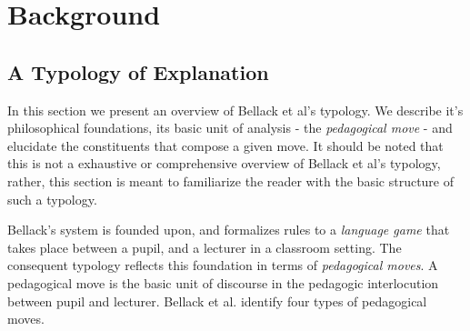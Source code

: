 \documentclass[conference]{IEEEtran}
\begin{document}
\section{Background}
\subsection{A Typology of Explanation}
In this section we present an overview of Bellack et al's typology. We describe
it's philosophical foundations, its basic unit of analysis - the
\emph{pedagogical move} - and elucidate the constituents that compose a given
move. It should be noted that this is not a exhaustive or comprehensive overview
of Bellack et al's typology, rather, this section is meant to familiarize the
reader with the basic structure of such a typology.

Bellack's system is founded upon, and formalizes rules to a \emph{language
  game}\cite{wittgenstein2010philosophical} that takes place between a pupil,
and a lecturer in a classroom setting. The consequent typology reflects this
foundation in terms of \emph{pedagogical moves}. A pedagogical move is the basic
unit of discourse in the pedagogic interlocution between pupil and lecturer.
Bellack et al. identify four types of pedagogical moves.
%
\end{document}
